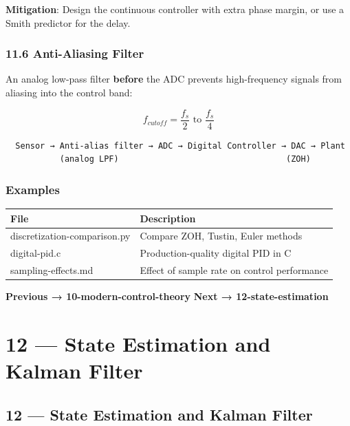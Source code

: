 \documentclass[11pt,a4paper]{book}
\begin{document}
\textbf{Mitigation}: Design the continuous controller with extra phase margin, or use a Smith predictor for the delay.

\medskip\noindent\hrulefill\medskip

\subsection{11.6 Anti-Aliasing Filter}

An analog low-pass filter \textbf{before} the ADC prevents high-frequency signals from aliasing into the control band:

\[f_{cutoff} = \frac{f_s}{2} \text{ to } \frac{f_s}{4}\]

\begin{lstlisting}
  Sensor → Anti-alias filter → ADC → Digital Controller → DAC → Plant
           (analog LPF)                                  (ZOH)
\end{lstlisting}

\medskip\noindent\hrulefill\medskip

\subsection{Examples}

\begin{center}
\begin{tabular}{|l|l|}
\hline
File & Description \\
\hline
discretization-comparison.py & Compare ZOH, Tustin, Euler methods \\
digital-pid.c & Production-quality digital PID in C \\
sampling-effects.md & Effect of sample rate on control performance \\
\hline
\end{tabular}
\end{center}

\medskip\noindent\hrulefill\medskip

\textbf{Previous → 10-modern-control-theory}  
\textbf{Next → 12-state-estimation}


\chapter{12 — State Estimation and Kalman Filter}
\section{12 — State Estimation and Kalman Filter}
\end{document}
